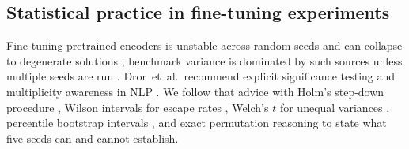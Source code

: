 \subsection{Statistical practice in fine-tuning experiments}
Fine-tuning pretrained encoders is unstable across random seeds and can collapse to degenerate solutions \cite{dodge2020finetuning,mosbach2021stability}; benchmark variance is dominated by such sources unless multiple seeds are run \cite{bouthillier2021variance}. Dror~et~al.\ recommend explicit significance testing and multiplicity awareness in NLP \cite{dror2018hitchhiker}. We follow that advice with Holm's step-down procedure \cite{holm1979simple}, Wilson intervals for escape rates \cite{wilson1927probable}, Welch's $t$ for unequal variances \cite{welch1947generalization}, percentile bootstrap intervals \cite{efron1993bootstrap}, and exact permutation reasoning \cite{good2005permutation} to state what five seeds can and cannot establish.
